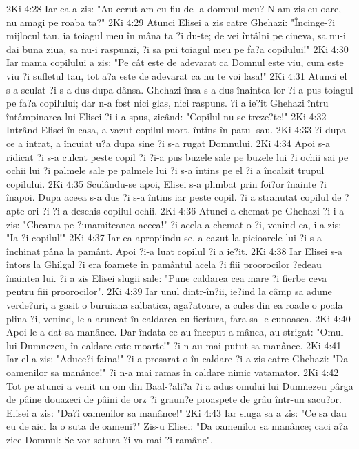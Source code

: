 2Ki 4:28  Iar ea a zis: "Au cerut-am eu fiu de la domnul meu? N-am zis eu oare, nu amagi pe roaba ta?"
2Ki 4:29  Atunci Elisei a zis catre Ghehazi: "Încinge-?i mijlocul tau, ia toiagul meu în mâna ta ?i du-te; de vei întâlni pe cineva, sa nu-i dai buna ziua, sa nu-i raspunzi, ?i sa pui toiagul meu pe fa?a copilului!"
2Ki 4:30  Iar mama copilului a zis: "Pe cât este de adevarat ca Domnul este viu, cum este viu ?i sufletul tau, tot a?a este de adevarat ca nu te voi lasa!"
2Ki 4:31  Atunci el s-a sculat ?i s-a dus dupa dânsa. Ghehazi însa s-a dus înaintea lor ?i a pus toiagul pe fa?a copilului; dar n-a fost nici glas, nici raspuns. ?i a ie?it Ghehazi întru întâmpinarea lui Elisei ?i i-a spus, zicând: "Copilul nu se treze?te!"
2Ki 4:32  Intrând Elisei în casa, a vazut copilul mort, întins în patul sau.
2Ki 4:33  ?i dupa ce a intrat, a încuiat u?a dupa sine ?i s-a rugat Domnului.
2Ki 4:34  Apoi s-a ridicat ?i s-a culcat peste copil ?i ?i-a pus buzele sale pe buzele lui ?i ochii sai pe ochii lui ?i palmele sale pe palmele lui ?i s-a întins pe el ?i a încalzit trupul copilului.
2Ki 4:35  Sculându-se apoi, Elisei s-a plimbat prin foi?or înainte ?i înapoi. Dupa aceea s-a dus ?i s-a întins iar peste copil. ?i a stranutat copilul de ?apte ori ?i ?i-a deschis copilul ochii.
2Ki 4:36  Atunci a chemat pe Ghehazi ?i i-a zis: "Cheama pe ?unamiteanca aceea!" ?i acela a chemat-o ?i, venind ea, i-a zis: "Ia-?i copilul!"
2Ki 4:37  Iar ea apropiindu-se, a cazut la picioarele lui ?i s-a închinat pâna la pamânt. Apoi ?i-a luat copilul ?i a ie?it.
2Ki 4:38  Iar Elisei s-a întors la Ghilgal ?i era foamete în pamântul acela ?i fiii proorocilor ?edeau înaintea lui. ?i a zis Elisei slugii sale: "Pune caldarea cea mare ?i fierbe ceva pentru fiii proorocilor".
2Ki 4:39  Iar unul dintr-în?ii, ie?ind la câmp sa adune verde?uri, a gasit o buruiana salbatica, aga?atoare, a cules din ea roade o poala plina ?i, venind, le-a aruncat în caldarea cu fiertura, fara sa le cunoasca.
2Ki 4:40  Apoi le-a dat sa manânce. Dar îndata ce au început a mânca, au strigat: "Omul lui Dumnezeu, în caldare este moarte!" ?i n-au mai putut sa manânce.
2Ki 4:41  Iar el a zis: "Aduce?i faina!" ?i a presarat-o în caldare ?i a zis catre Ghehazi: "Da oamenilor sa manânce!" ?i n-a mai ramas în caldare nimic vatamator.
2Ki 4:42  Tot pe atunci a venit un om din Baal-?ali?a ?i a adus omului lui Dumnezeu pârga de pâine douazeci de pâini de orz ?i graun?e proaspete de grâu într-un sacu?or. Elisei a zis: "Da?i oamenilor sa manânce!"
2Ki 4:43  Iar sluga sa a zis: "Ce sa dau eu de aici la o suta de oameni?" Zis-u Elisei: "Da oamenilor sa manânce; caci a?a zice Domnul: Se vor satura ?i va mai ?i ramâne".
